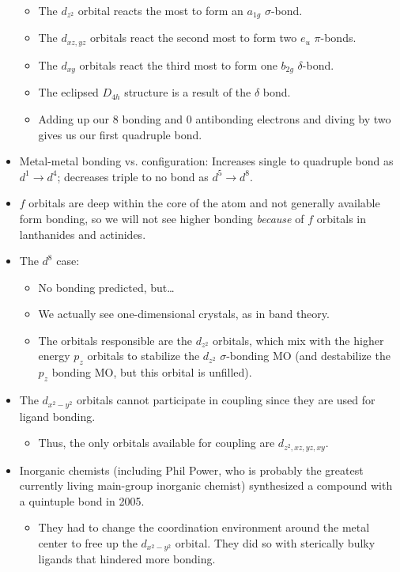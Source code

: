 \documentclass[../notes.tex]{subfiles}
\begin{document}
\begin{itemize}
\begin{itemize}
\begin{itemize}
        \end{itemize}
        \item The $d_{z^2}$ orbital reacts the most to form an $a_{1g}$ $\sigma$-bond.
        \item The $d_{xz,yz}$ orbitals react the second most to form two $e_u$ $\pi$-bonds.
        \item The $d_{xy}$ orbitals react the third most to form one $b_{2g}$ $\delta$-bond.
        \item The eclipsed $D_{4h}$ structure is a result of the $\delta$ bond.
        \item Adding up our 8 bonding and 0 antibonding electrons and diving by two gives us our first quadruple bond.
    \end{itemize}
    \item Metal-metal bonding vs. configuration: Increases single to quadruple bond as $d^1\to d^4$; decreases triple to no bond as $d^5\to d^8$.
    \item $f$ orbitals are deep within the core of the atom and not generally available form bonding, so we will not see higher bonding \emph{because} of $f$ orbitals in lanthanides and actinides.
    \item The $d^8$ case:
    \begin{itemize}
        \item No bonding predicted, but\dots
        \item We actually see one-dimensional crystals, as in band theory.
        \item The orbitals responsible are the $d_{z^2}$ orbitals, which mix with the higher energy $p_z$ orbitals to stabilize the $d_{z^2}$ $\sigma$-bonding MO (and destabilize the $p_z$ bonding MO, but this orbital is unfilled).
    \end{itemize}
    \item The $d_{x^2-y^2}$ orbitals cannot participate in  coupling since they are used for ligand bonding.
    \begin{itemize}
        \item Thus, the only orbitals available for coupling are $d_{z^2,xz,yz,xy}$.
    \end{itemize}
    \item Inorganic chemists (including Phil Power, who is probably the greatest currently living main-group inorganic chemist) synthesized a compound with a quintuple bond in 2005.
    \begin{itemize}
        \item They had to change the coordination environment around the metal center to free up the $d_{x^2-y^2}$ orbital. They did so with sterically bulky ligands that hindered more bonding.

\end{itemize}
\end{itemize}
\end{document}
